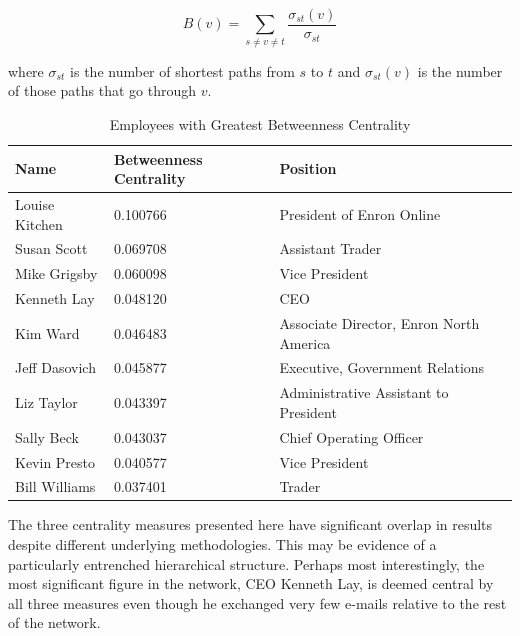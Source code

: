 \documentclass[12pt]{article}
\begin{document}
	\begin{equation}
			B(v) = \sum\limits_{s\neq v \neq t} \frac{\sigma_{st}(v)}{\sigma_{st}}
	\end{equation}

where $\sigma_{st}$ is the number of shortest paths from $s$ to $t$ and $\sigma_{st}(v)$ is the number of those paths that go through $v$.
	        
        \begin{table}[h]
        \caption{Employees with Greatest Betweenness Centrality}
        \centering
        \begin{tabular}{|l|l|l|}
        \hline
        \textbf{Name}  & \textbf{Betweenness Centrality} & \textbf{Position}                       \\ \hline
        Louise Kitchen & 0.100766                        & President of Enron Online               \\ \hline
        Susan Scott    & 0.069708                        & Assistant Trader                        \\ \hline
        Mike Grigsby   & 0.060098                        & Vice President                                        \\ \hline
        Kenneth Lay    & 0.048120                        & CEO                                     \\ \hline
        Kim Ward       & 0.046483                        & Associate Director, Enron North America \\ \hline
        Jeff Dasovich  & 0.045877                        & Executive, Government Relations         \\ \hline
        Liz Taylor     & 0.043397                        & Administrative Assistant to President   \\ \hline
        Sally Beck     & 0.043037                        & Chief Operating Officer                 \\ \hline
        Kevin Presto   & 0.040577                        & Vice President                          \\ \hline
        Bill Williams  & 0.037401                        & Trader                                  \\ \hline
        \end{tabular}
        \end{table}
        
        The three centrality measures presented here have significant overlap in results despite different underlying methodologies. This may be evidence of a particularly entrenched hierarchical structure. Perhaps most interestingly, the most significant figure in the network, CEO Kenneth Lay, is deemed central by all three measures even though he exchanged very few e-mails relative to the rest of the network.
        
\end{document}
